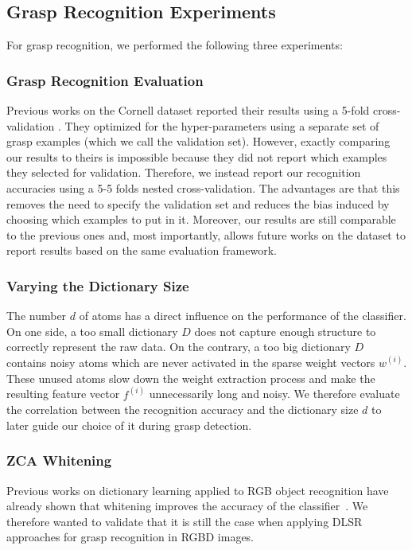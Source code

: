 \documentclass[svgnames]{scrartcl}
\begin{document}
\subsection{Grasp Recognition Experiments}

For grasp recognition, we performed the following three experiments:

\subsubsection{Grasp Recognition Evaluation}

Previous works on the Cornell dataset reported their results using a 5-fold cross-validation \citep{jiang2011efficient, lenz2015deep}. They optimized for the hyper-parameters using a separate set of grasp examples (which we call the validation set). However, exactly comparing our results to theirs is impossible because they did not report which examples they selected for validation. Therefore, we instead report our recognition accuracies using a 5-5 folds nested cross-validation. The advantages are that this removes the need to specify the validation set and reduces the bias induced by choosing which examples to put in it. Moreover, our results are still comparable to the previous ones and, most importantly, allows future works on the dataset to report results based on the same evaluation framework.

\subsubsection{Varying the Dictionary Size}

The number $d$ of atoms has a direct influence on the performance of the classifier. On one side, a too small dictionary $D$ does not capture enough structure to correctly represent the raw data. On the contrary, a too big dictionary $D$ contains noisy atoms which are never activated in the sparse weight vectors $w^{(i)}$. These unused atoms slow down the weight extraction process and make the resulting feature vector $f^{(i)}$ unnecessarily long and noisy. We therefore evaluate the correlation between the recognition accuracy and the dictionary size $d$ to later guide our choice of it during grasp detection.

\subsubsection{ZCA Whitening}

Previous works on dictionary learning applied to RGB object recognition have already shown that whitening improves the accuracy of the classifier~\citep{coates2011analysis, coates2011importance}. We therefore wanted to validate that it is still the case when applying DLSR approaches for grasp recognition in RGBD images.
\end{document}
